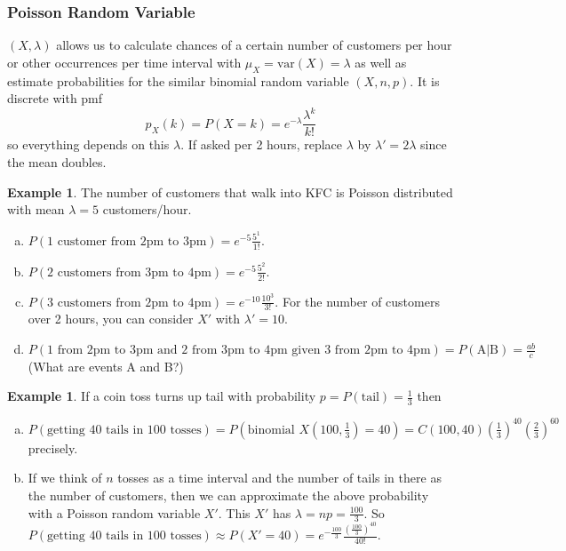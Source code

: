 \documentclass[12pt]{amsart}
\theoremstyle{definition}
\newtheorem{example}[theorem]{Example}
\begin{document}
\subsubsection{Poisson Random Variable} $(X, \lambda)$ allows us to calculate chances of a certain number
of customers per hour or other occurrences per time interval with $\mu_X = \text{var}(X) = \lambda$ as well as estimate probabilities for the similar binomial random variable $(X, n, p)$. It is discrete with pmf
$$p_X(k) = P(X = k) = e^{-\lambda}\frac{\lambda ^{k}}{k!}$$
so everything depends on this $\lambda$. If asked per 2 hours, replace $\lambda$ by $\lambda' = 2\lambda$ since the
mean doubles.

\begin{example} The number of customers that walk into KFC is Poisson distributed with mean $\lambda = 5$ customers/hour.
\begin{enumerate}[a.]
\item $P(\text{1 customer from 2pm to 3pm}) = e^{-5}\frac{5^1}{1!}$.
\item $P(\text{2 customers from 3pm to 4pm}) = e^{-5}\frac{5^2}{2!}$.
\item $P(\text{3 customers from 2pm to 4pm}) = e^{-10}\frac{10^{3}}{3!}$. For the number of customers over 2 hours, you can consider $X'$ with $\lambda' = 10$.
\item $P(\text{1 from 2pm to 3pm and 2 from 3pm to 4pm given 3 from 2pm to 4pm})= P(\text{A}|\text{B}) =
\frac{ab}{c}$ (What are events A and B?)
\end{enumerate}
\end{example}

\begin{example} If a coin toss turns up tail with probability $p = P(\text{tail}) = \frac{1}{3}$ then
\begin{enumerate}[a.]
\item $P(\text{getting 40 tails in 100 tosses}) = P(\text{binomial } X(100, \frac{1}{3}) = 40) = C(100, 40)(\frac{1}{3})^{40}(\frac{2}{3})^{60}$ precisely.
\item If we think of $n$ tosses as a time interval and the number of tails in there as the number of customers, then we can approximate the above probability with a Poisson random variable $X'$. This $X'$ has $\lambda =np= \frac{100}{3}$. So $P(\text{getting 40 tails in 100 tosses}) \approx P(X' = 40) = e^{-\frac{100}{3}} \frac{ \left( \frac{100}{3} \right)^{40}}{40!}$.
\end{enumerate}
\end{example}
\end{document}
